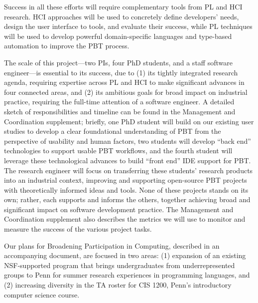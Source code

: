 \iflater{}\fi
Success in all these efforts will require complementary tools from PL and
HCI research. HCI approaches will be used to concretely define
developers' needs, design the user interface to tools, and evaluate
their success, while PL techniques will be used to develop powerful
domain-specific languages and type-based automation to improve the PBT
process.

The scale of this project---two PIs, four PhD students, and a staff
software engineer---is essential to its success, due to (1) its
tightly integrated research agenda, requiring expertise across PL and
HCI to make significant advances in four connected areas, and (2) its
ambitious goals for broad impact on industrial
practice, requiring the full-time attention of a software engineer.
%
A detailed sketch of responsibilities and timeline can be found in the
Management and Coordination supplement; briefly,
one PhD student will build on our existing user studies to
develop a clear foundational understanding of
PBT from the perspective of usability and human factors, two students
will develop ``back end'' technologies to support usable
PBT workflows, and the fourth student will leverage these technological
advances to build ``front end'' IDE support for PBT. The
research engineer will focus on transferring these
students' research products into an industrial context, improving and supporting
open-source PBT projects with theoretically informed ideas and tools. None of these
projects stands on its own; rather, each supports and informs the
others, together achieving broad and significant impact on software
development practice.
%
The Management and Coordination supplement also describes the metrics
we will use to monitor and measure the success of the various project
tasks.



Our plans for Broadening Participation in Computing, described in an
accompanying document, are focused in two areas: (1) expansion of an
existing NSF-supported program that brings undergraduates from
underrepresented groups to Penn for summer research experiences in
programming languages, and (2) increasing diversity in the TA roster
for CIS 1200, Penn's introductory computer science course.

